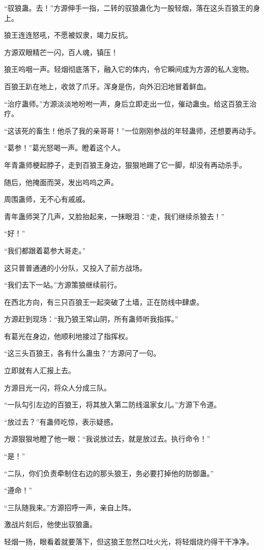 \begin{this_body}
“驭狼蛊。去！”方源伸手一指，二转的驭狼蛊化为一股轻烟，落在这头百狼王的身上。

狼王连连怒吼，不愿被奴隶，竭力反抗。

方源双眼精芒一闪，百人魂，镇压！

狼王呜咽一声。轻烟彻底落下，融入它的体内，令它瞬间成为方源的私人宠物。

百狼王趴在地上，收敛了爪牙。浑身是伤，向外汩汩地冒着鲜血。

“治疗蛊师。”方源淡淡地吩咐一声，身后立即走出一位，催动蛊虫。给这百狼王治疗。

“这该死的畜生！他杀了我的亲哥哥！”一位刚刚参战的年轻蛊师，还想要再动手。

“葛参！”葛光怒喝一声。瞪着这个人。

年青蛊师梗起脖子，走到百狼王身边，狠狠地踢了它一脚，却没有再动杀手。

随后，他掩面而哭，发出呜呜之声。

周围蛊师，无不心有戚戚。

青年蛊师哭了几声，又脸抬起来，一抹眼泪：“走，我们继续杀狼去！”

“好！”

“我们都跟着葛参大哥走。”

这只普普通通的小分队，又投入了前方战场。

“我们去下一站。”方源策狼继续前行。

在西北方向，有三只百狼王一起突破了土墙，正在防线中肆虐。

方源赶到现场：“我乃狼王常山阴，所有蛊师听我指挥。”

有葛光在身边，他顺利地接过了指挥权。

“这三头百狼王，各有什么蛊虫？”方源问了一句。

立即就有人汇报上去。

方源目光一闪，将众人分成三队。

“一队勾引左边的百狼王，将其放入第二防线温家女儿。”方源下令道。

“放过去？”有蛊师吃惊，表示疑惑。

方源狠狠地瞪了他一眼：“我说放过去，就是放过去。执行命令！”

“是！”

“二队，你们负责牵制住右边的那头狼王，务必要打掉他的防御蛊。”

“遵命！”

“三队随我来。”方源招呼一声，亲自上阵。

激战片刻后，他使出驭狼蛊。

轻烟一扬，眼看着就要落下，但这狼王忽然口吐火光，将轻烟烧灼得干干净净。


\end{this_body}
